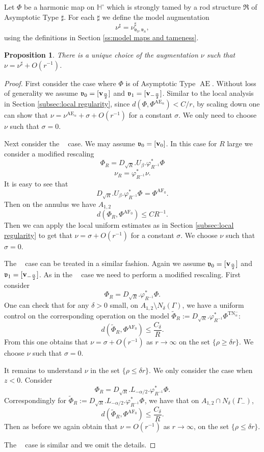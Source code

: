 \documentclass[a4paper,11pt]{amsart}
\newtheorem{proposition}[theorem]{Proposition}
\theoremstyle{definition}
\numberwithin{equation}{section}
\newcommand{\dH}{\mathbb{H}}
\newcommand{\mv} {\mathfrak v}
\newcommand{\mR} {\mathfrak R}
\DeclareMathOperator{\bv}{{\bf v}}
\DeclareMathOperator{\Ae}{AE}
\DeclareMathOperator{\TN}{TN}
\DeclareMathOperator{\TNam}{TN^{--}_\alpha}
\DeclareMathOperator{\ALFp}{ALF^+}
\DeclareMathOperator{\ALFm}{ALF^{--}}
\DeclareMathOperator{\AF}{AF}
\DeclareMathOperator{\AFa}{AF_\beta}
\begin{document}
Let $\Phi$ be a harmonic map on $\dH^\circ$ which is strongly tamed by a rod structure $\mR$ of  Asymptotic Type  $\sharp$.  For each $\sharp$ we define the model augmentation 
$$\nu^\sharp=\nu_{\mv_0, \mv_n}^\sharp,$$
using the definitions in Section \ref{ss:model maps and tameness}.




\begin{proposition}\label{prop:normalizing augmentation}
	There is a unique choice of the augmentation $\nu$ such that $\nu=\nu^\sharp+O(r^{-1})$.
\end{proposition}
\begin{proof}
First consider the case where $\Phi$ is of  Asymptotic Type  $\Ae$. Without loss of generality we assume $\mv_0=[\bv_{\frac{\alpha}{2}}]$ and $\mv_1=[\bv_{-\frac{\alpha}{2}}]$. Similar to the local analysis in Section \ref{subsec:local regularity}, since $d(\Phi,\Phi^{\Ae_\alpha})<C/r$, by scaling down one can show that $\nu=\nu^{\Ae_\alpha}+\sigma+O(r^{-1})$ for a constant $\sigma$.  We only need to choose $\nu$ such that $\sigma=0$. 


Next consider the $\AFa$ case. We may assume $\mv_0=[\bv_0]$. In this case for $R$ large we consider a modified rescaling 
$$\Phi_R=D_{\sqrt{R}}.U_\beta.\varphi_{R^{-1}}^*\Phi $$
$$\nu_R=\varphi_{R^{-1}}^*\nu.$$
It is easy to see that $$D_{\sqrt{R}}.U_\beta.\varphi_{R^{-1}}^*\Phi^{\AFa}=\Phi^{\AF_0}.$$
Then  on the annulus we have $A_{1,2}$  $$d(\Phi_R, \Phi^{\AF_0})\leq CR^{-1}.$$
Then we can apply the local uniform estimates as in Section \ref{subsec:local regularity} to get that $\nu=\sigma+O(r^{-1})$ for a constant $\sigma$. We choose $\nu$ such that $\sigma=0$. 

The $\ALFm$ case can be treated in a similar fashion. Again we assume $\mv_0=[\bv_{\frac{\alpha}{2}}]$ and $\mv_1=[\bv_{-\frac{\alpha}{2}}]$. As in the $\AFa$ case we need to perform a modified rescaling. 
First consider 
$$\Phi_R=D_{\sqrt{R}}. \varphi_{R^{-1}}^*\Phi.$$
One can check that for any $\delta>0$ small, on $A_{1, 2}\setminus N_\delta(\Gamma)$, we have a uniform control on  the corresponding operation on the model $\widetilde \Phi_R:=D_{\sqrt{R}}. \varphi_{R^{-1}}^*\Phi^{\TN^{-}_\alpha}$:
$$d(\widetilde\Phi_R, \Phi^{\AF_0})\leq \frac{C_\delta}{R}.$$
From this one obtains that $\nu=\sigma+O(r^{-1})$ as $r\rightarrow\infty$ on the set $\{\rho\geq \delta r\}$. We choose $\nu$ such that $\sigma=0$.

It remains to understand $\nu$ in the set $\{\rho\leq \delta r\}$. We only consider the case when $z<0$. Consider 
$$\Phi_R=D_{\sqrt{R}}.L_{-\alpha/2}. \varphi_{R^{-1}}^*\Phi. $$
Correspondingly for $\widetilde \Phi_R:=D_{\sqrt{R}}. L_{-\alpha/2}. \varphi_{R^{-1}}^*\Phi^{\TNam}$, we have that on $A_{1, 2}\cap N_\delta(\Gamma_{-})$, 
$$d(\widetilde\Phi_R, \Phi^{\AF_0})\leq \frac{C_\delta}{R}.$$ 
Then as before we again obtain that $\nu=O(r^{-1})$ as $r\rightarrow\infty$, on the set $\{\rho\leq \delta r\}$. 

The $\ALFp$ case is similar and we omit the details.
\end{proof}
\end{document}
